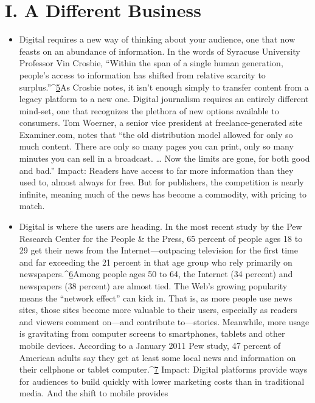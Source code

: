 \section{I. A Different Business}
\begin{itemize}
\item Digital requires a new way of thinking about your audience, one that
now feasts on an abundance of information. In the words of Syracuse
University Professor Vin Crosbie, ``Within the span of a single human generation,
people's access to information has shifted from relative scarcity to
surplus.''^{\href{#endnotes-chapter-1}{5}}As Crosbie notes, it isn't enough simply to transfer content from
a legacy platform to a new one. Digital journalism requires an entirely different
mind-set, one that recognizes the plethora of new options available
to consumers. Tom Woerner, a senior vice president at freelance-generated
site Examiner.com, notes that ``the old distribution model allowed for only
so much content. There are only so many pages you can print, only so many
minutes you can sell in a broadcast. … Now the limits are gone, for both
good and bad.''
Impact: Readers have access to far more information than they used to,
almost always for free. But for publishers, the competition is nearly infinite,
meaning much of the news has become a commodity, with pricing to match.
\item Digital is where the users are heading. In the most recent study by the
Pew Research Center for the People & the Press, 65 percent of people ages
18 to 29 get their news from the Internet—outpacing television for the first
time and far exceeding the 21 percent in that age group who rely primarily
on newspapers.^{\href{#endnotes-chapter-1}{6}}Among people ages 50 to 64, the Internet (34 percent)
and newspapers (38 percent) are almost tied. The Web's growing popularity
means the ``network effect'' can kick in. That is, as more people use news
sites, those sites become more valuable to their users, especially as readers and
viewers comment on—and contribute to—stories. Meanwhile, more usage
is gravitating from computer screens to smartphones, tablets and other mobile
devices. According to a January 2011 Pew study, 47 percent of American
adults say they get at least some local news and information on their cellphone
or tablet computer.^{\href{#endnotes-chapter-1}{7}}%
Impact: Digital platforms provide ways for audiences to build quickly with
lower marketing costs than in traditional media. And the shift to mobile provides

\end{itemize}
